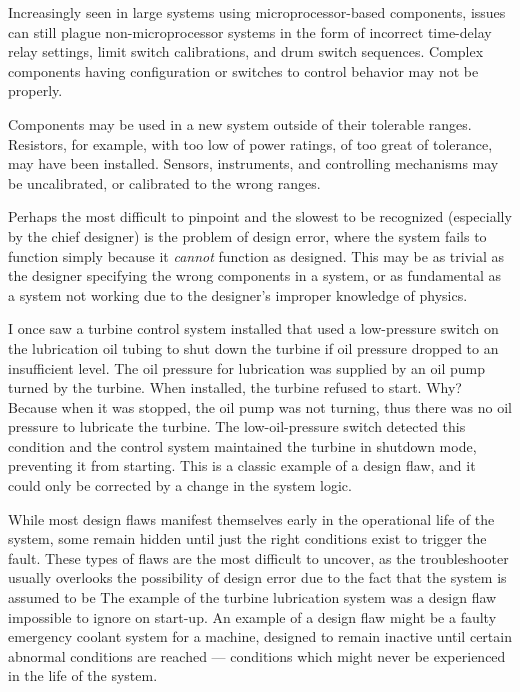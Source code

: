 \stopsubsection

\startsubsection[title={Improper System
Configuration},reference={sec:xtocid157909723}]

Increasingly seen in large systems using microprocessor-based
components,  issues can still plague
non-microprocessor systems in the form of incorrect time-delay relay
settings, limit switch calibrations, and drum switch sequences. Complex
components having configuration  or switches to
control behavior may not be  properly.

Components may be used in a new system outside of their tolerable
ranges. Resistors, for example, with too low of power ratings, of too
great of tolerance, may have been installed. Sensors, instruments, and
controlling mechanisms may be uncalibrated, or calibrated to the wrong
ranges.

\stopsubsection

\startsubsection[title={Design Error},reference={sec:xtocid157909724}]

Perhaps the most difficult to pinpoint and the slowest to be recognized
(especially by the chief designer) is the problem of design error, where
the system fails to function simply because it {\em cannot} function as
designed. This may be as trivial as the designer specifying the wrong
components in a system, or as fundamental as a system not working due to
the designer's improper knowledge of physics.

I once saw a turbine control system installed that used a low-pressure
switch on the lubrication oil tubing to shut down the turbine if oil
pressure dropped to an insufficient level. The oil pressure for
lubrication was supplied by an oil pump turned by the turbine. When
installed, the turbine refused to start. Why? Because when it was
stopped, the oil pump was not turning, thus there was no oil pressure to
lubricate the turbine. The low-oil-pressure switch detected this
condition and the control system maintained the turbine in shutdown
mode, preventing it from starting. This is a classic example of a design
flaw, and it could only be corrected by a change in the system logic.

While most design flaws manifest themselves early in the operational
life of the system, some remain hidden until just the right conditions
exist to trigger the fault. These types of flaws are the most difficult
to uncover, as the troubleshooter usually overlooks the possibility of
design error due to the fact that the system is assumed to be
 The example of the turbine lubrication system was a
design flaw impossible to ignore on start-up. An example of a
 design flaw might be a faulty emergency coolant
system for a machine, designed to remain inactive until certain abnormal
conditions are reached --- conditions which might never be experienced
in the life of the system.

